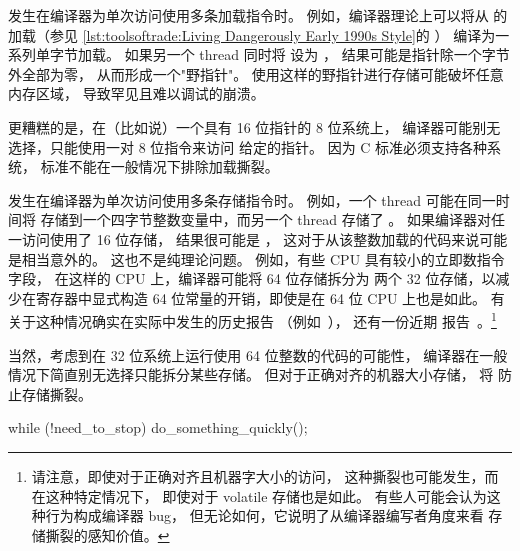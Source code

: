 \begin{description}[labelsep=.4em]
\item[加载撕裂（Load tearing）] 发生在编译器为单次访问使用多条加载指令时。
例如，编译器理论上可以将从  的加载（参见
\cref{lst:toolsoftrade:Living Dangerously Early 1990s Style}的
）
编译为一系列单字节加载。
如果另一个 thread 同时将  设为 ，
结果可能是指针除一个字节外全部为零，
从而形成一个"野指针"。
使用这样的野指针进行存储可能破坏任意内存区域，
导致罕见且难以调试的崩溃。

更糟糕的是，在（比如说）一个具有 16 位指针的 8 位系统上，
编译器可能别无选择，只能使用一对 8 位指令来访问
给定的指针。
因为 C 标准必须支持各种系统，
标准不能在一般情况下排除加载撕裂。

\item[存储撕裂（Store tearing）] 发生在编译器为单次访问使用多条存储指令时。
例如，一个 thread 可能在同一时间将 
存储到一个四字节整数变量中，而另一个 thread 存储了 。
如果编译器对任一访问使用了 16 位存储，
结果很可能是 ，
这对于从该整数加载的代码来说可能是相当意外的。
这也不是纯理论问题。
例如，有些 CPU 具有较小的立即数指令字段，
在这样的 CPU 上，编译器可能将 64 位存储拆分为
两个 32 位存储，以减少在寄存器中显式构造
64 位常量的开销，即使是在 64 位 CPU 上也是如此。
有关于这种情况确实在实际中发生的历史报告
（例如~\cite{KonstantinKhlebnikov2013gccstoretearing}），
还有一份近期
报告~\cite{WillDeacon2019StoreTearingReport}。\footnote{
	请注意，即使对于正确对齐且机器字大小的访问，
	这种撕裂也可能发生，而在这种特定情况下，
	即使对于 volatile 存储也是如此。
	有些人可能会认为这种行为构成编译器 bug，
	但无论如何，它说明了从编译器编写者角度来看
	存储撕裂的感知价值。
}

当然，考虑到在 32 位系统上运行使用 64 位整数的代码的可能性，
编译器在一般情况下简直别无选择只能拆分某些存储。
但对于正确对齐的机器大小存储， 将
防止存储撕裂。

\begin{listing}
\begin{fcvlabel}
\begin{VerbatimLL}[commandchars=\\\{\}]
while (!need_to_stop)
	do_something_quickly();
\end{VerbatimLL}
\end{fcvlabel}
\caption{招致加载融合}
\label{lst:toolsoftrade:Inviting Load Fusing}
\end{listing}


\end{description}
